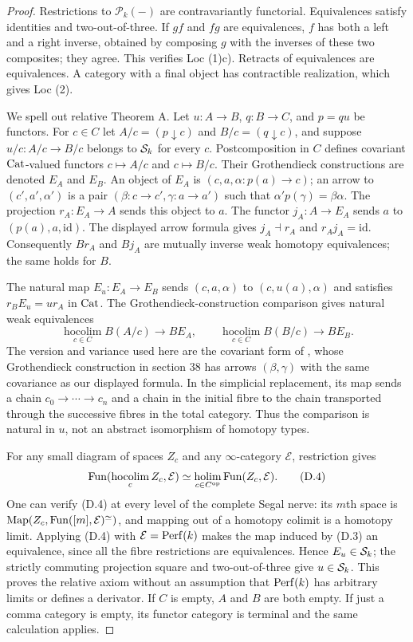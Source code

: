 \begin{proof}
Restrictions to $\mathcal P_k(-)$ are contravariantly functorial.
Equivalences satisfy identities and two-out-of-three. If $gf$ and $fg$
are equivalences, $f$ has both a left and a right inverse, obtained by
composing $g$ with the inverses of these two composites; they agree.
This verifies Loc (1)c). Retracts of equivalences are equivalences.
A category with a final object has contractible realization, which
gives Loc (2).

We spell out relative Theorem A. Let $u:A\to B$, $q:B\to C$, and
$p=qu$ be functors. For $c\in C$ let $A/c=(p\downarrow c)$ and
$B/c=(q\downarrow c)$, and suppose $u/c:A/c\to B/c$ belongs to
$\mathcal S_k$ for every $c$. Postcomposition in $C$ defines covariant
$\mathrm{Cat}$-valued functors $c\mapsto A/c$ and $c\mapsto B/c$.
Their Grothendieck constructions are denoted $E_A$ and $E_B$.
An object of $E_A$ is $(c,a,\alpha:p(a)\to c)$; an arrow to
$(c',a',\alpha')$ is a pair $(\beta:c\to c',\gamma:a\to a')$
such that $\alpha' p(\gamma)=\beta\alpha$.
The projection $r_A:E_A\to A$ sends this object to $a$.
The functor $j_A:A\to E_A$ sends $a$ to $(p(a),a,\mathrm{id})$.
The displayed arrow formula gives $j_A\dashv r_A$ and $r_Aj_A=\mathrm{id}$.
Consequently $Br_A$ and $Bj_A$ are mutually inverse weak homotopy
equivalences; the same holds for $B$.

The natural map $E_u:E_A\to E_B$ sends
$(c,a,\alpha)$ to $(c,u(a),\alpha)$ and satisfies
$r_BE_u=ur_A$ in $\mathrm{Cat}$. The Grothendieck-construction comparison gives
natural weak equivalences
\[
 \operatorname*{hocolim}_{c\in C}B(A/c)\longrightarrow BE_A,
 \qquad
 \operatorname*{hocolim}_{c\in C}B(B/c)\longrightarrow BE_B.
 \tag{D.3}
\]
The version and variance used here are the covariant form of
\citet[Theorem 26.8 and Corollary 26.9]{AChacholskiScherer},
whose Grothendieck construction in section 38 has arrows
$(\beta,\gamma)$ with the same covariance as our displayed formula.
In the simplicial
replacement, its map sends a chain $c_0\to\cdots\to c_n$ and a
chain in the initial fibre to the chain transported through the
successive fibres in the total category. Thus the comparison is natural
in $u$, not an abstract isomorphism of homotopy types.

For any small diagram of spaces $Z_c$ and any $\infty$-category
$\mathcal E$, restriction gives
\[
 \operatorname{Fun}(\operatorname*{hocolim}_c Z_c,\mathcal E)
       \simeq\operatorname*{holim}_{c\in C^{\mathrm{op}}}
                  \operatorname{Fun}(Z_c,\mathcal E).
 \tag{D.4}
\]
One can verify (D.4) at every level of the complete Segal nerve: its
$m$th space is $\operatorname{Map}(Z_c,
\operatorname{Fun}([m],\mathcal E)^{\simeq})$, and mapping out of a homotopy colimit
is a homotopy limit. Applying (D.4) with $\mathcal E=\operatorname{Perf}(k)$ makes
the map induced by (D.3) an equivalence, since all the fibre
restrictions are equivalences. Hence $E_u\in\mathcal S_k$; the strictly
commuting projection square and two-out-of-three give $u\in\mathcal S_k$.
This proves the relative axiom without an assumption that $\operatorname{Perf}(k)$
has arbitrary limits or defines a derivator. If $C$ is empty, $A$ and
$B$ are both empty. If just a comma category is empty, its functor
category is terminal and the same calculation applies.
\end{proof}

